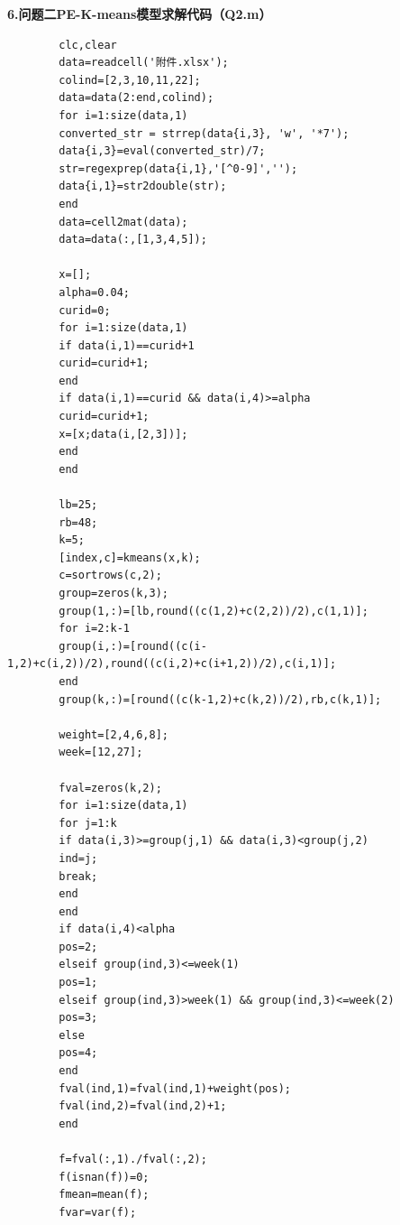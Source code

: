 \documentclass[12pt]{ctexart}
\begin{document}
	\noindent \textbf{\heiti 6.问题二PE-K-means模型求解代码（Q2.m）}
	\begin{verbatim}
		clc,clear
		data=readcell('附件.xlsx');
		colind=[2,3,10,11,22];
		data=data(2:end,colind);
		for i=1:size(data,1)
		converted_str = strrep(data{i,3}, 'w', '*7');
		data{i,3}=eval(converted_str)/7;
		str=regexprep(data{i,1},'[^0-9]','');
		data{i,1}=str2double(str);
		end
		data=cell2mat(data);
		data=data(:,[1,3,4,5]);
		
		x=[];
		alpha=0.04;
		curid=0;
		for i=1:size(data,1)
		if data(i,1)==curid+1
		curid=curid+1;
		end
		if data(i,1)==curid && data(i,4)>=alpha
		curid=curid+1;
		x=[x;data(i,[2,3])];
		end
		end
		
		lb=25;
		rb=48;
		k=5;
		[index,c]=kmeans(x,k);
		c=sortrows(c,2);
		group=zeros(k,3);
		group(1,:)=[lb,round((c(1,2)+c(2,2))/2),c(1,1)];
		for i=2:k-1
		group(i,:)=[round((c(i-1,2)+c(i,2))/2),round((c(i,2)+c(i+1,2))/2),c(i,1)];
		end
		group(k,:)=[round((c(k-1,2)+c(k,2))/2),rb,c(k,1)];
		
		weight=[2,4,6,8];
		week=[12,27];
		
		fval=zeros(k,2);
		for i=1:size(data,1)
		for j=1:k
		if data(i,3)>=group(j,1) && data(i,3)<group(j,2)
		ind=j;
		break;
		end
		end
		if data(i,4)<alpha
		pos=2;
		elseif group(ind,3)<=week(1)
		pos=1;
		elseif group(ind,3)>week(1) && group(ind,3)<=week(2)
		pos=3;
		else
		pos=4;
		end
		fval(ind,1)=fval(ind,1)+weight(pos);
		fval(ind,2)=fval(ind,2)+1;
		end
		
		f=fval(:,1)./fval(:,2);
		f(isnan(f))=0;
		fmean=mean(f);
		fvar=var(f);
	\end{verbatim}
	
\end{document}

